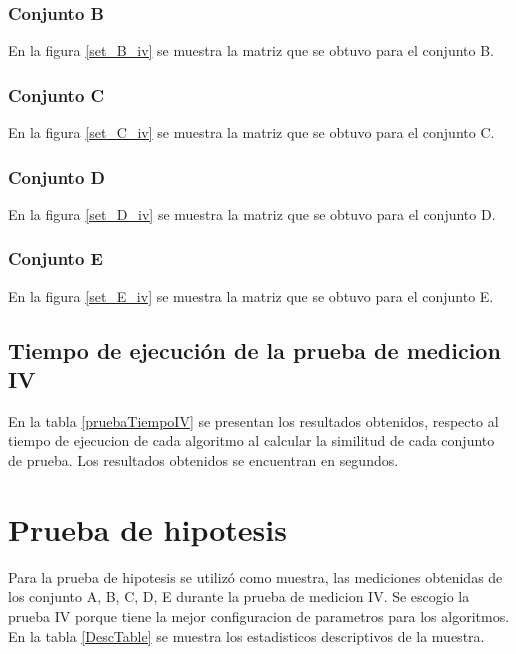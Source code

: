 \subsubsection{Conjunto B}
En la figura \ref{set_B_iv} se muestra la matriz que se obtuvo para el conjunto B.


\subsubsection{Conjunto C}
En la figura \ref{set_C_iv} se muestra la matriz que se obtuvo para el conjunto C.


\subsubsection{Conjunto D}
En la figura \ref{set_D_iv} se muestra la matriz que se obtuvo para el conjunto D.


\subsubsection{Conjunto E}
En la figura \ref{set_E_iv} se muestra la matriz que se obtuvo para el conjunto E.



\subsection{Tiempo de ejecución de la prueba de medicion IV}
En la tabla \ref{pruebaTiempoIV} se presentan los resultados obtenidos, respecto al tiempo de ejecucion de cada algoritmo al calcular la similitud de cada conjunto de prueba. Los resultados obtenidos se encuentran en segundos.



\section{Prueba de hipotesis}
Para la prueba de hipotesis se utilizó como muestra, las mediciones obtenidas de los conjunto A, B, C, D, E durante la prueba de medicion IV. Se escogio la prueba IV porque tiene la mejor configuracion de parametros para los algoritmos. En la tabla \ref{DescTable} se muestra los estadisticos descriptivos de la muestra.




